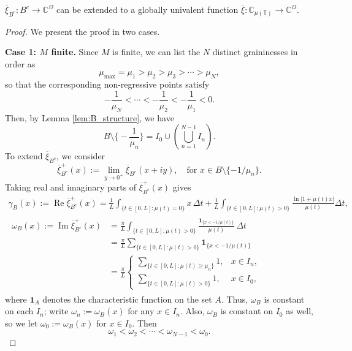 \documentclass[reqno]{amsart}
\begin{document}
\begin{theorem}
\label{thm:GlobalUnivalence}
$\overline{\xi}_{B^c}:B^c \to \mathbb{C}^{\Omega}$ can be extended to a globally univalent function
$\overline{\xi}:\mathbb{C}_{\mu(\mathbb{T})} \to \mathbb{C}^{\Omega}$.
\end{theorem}

\begin{proof}
We present the proof in two cases.
\smallskip

\noindent\textbf{Case 1: $M$ finite.}
Since $M$ is finite, we can list the $N$ distinct graininesses in order as
 \[
 \mu_{\max}=\mu_1>\mu_2>\mu_3>\cdots>\mu_N,
 \]
so that the corresponding non-regressive points satisfy
 \[
 -\frac{1}{\mu_N} < \cdots < -\frac{1}{\mu_2} < -\frac{1}{\mu_1} < 0.
 \]
Then, by Lemma \ref{lem:B_structure}, we have
$$
 B\setminus \Big\{-\frac{1}{\mu_n}\Big\}
 = I_0 \cup \left(\bigcup_{n=1}^{N-1} I_n\right).
$$
To extend $\overline{\xi}_{B^c}$, we consider
\begin{equation}\label{setup}
 \overline{\xi}_{B^c}^+(x):=\lim_{y\to 0^+}\overline{\xi}_{B^c}(x+iy),
 \quad\text{for } x\in B\setminus\{-1/\mu_n\}.
\end{equation}
Taking real and imaginary parts of $\overline{\xi}_{B^c}^+(x)$ gives
\begin{gather*}
 \gamma_B(x):=\operatorname{Re} \overline{\xi}_{B^c}^+(x)
 =\frac{1}{L}\int_{\{t\in[0,L]:\mu(t)=0\}} x\,\Delta t
  + \frac{1}{L}\int_{\{t\in[0,L]:\mu(t)>0\}} \frac{\ln|1+\mu(t) x|}{\mu(t)}
  \Delta t,
\\
\begin{aligned}
 \omega_B(x):=\operatorname{Im} \overline{\xi}_{B^c}^+(x)
 &=\frac{\pi}{L}\int_{\{t\in[0,L]:\mu(t)>0\}}
  \frac{\mathbf 1_{\{x<-1/\mu(t)\}}}{\mu(t)}\,\Delta t\\
 &=\frac{\pi}{L} \sum_{\{t\in[0,L]:\mu(t)>0\}} \mathbf 1_{\{x<-1/\mu(t)\}}\\
 &=\frac{\pi}{L}
 \begin{cases}
 \sum_{\{t\in[0,L]:\mu(t)\ge \mu_n\}} 1, & x\in I_n,\\
 \sum_{\{t\in[0,L]:\mu(t)>0\}} 1, & x\in I_0,
 \end{cases}
\end{aligned}
\end{gather*}
where $\mathbf{1}_A$ denotes the characteristic function on the set $A$.
Thus, $\omega_B$ is constant on each $I_n$; write $\omega_n:=\omega_B(x)$ for any
$x\in I_n$. Also, $\omega_B$ is constant on $I_0$ as well, so we let
$\omega_0:=\omega_B(x)$ for $x\in I_0$. Then
 $$
 \omega_1<\omega_2<\cdots<\omega_{N-1}<\omega_0.
 $$


\end{proof}
\end{document}
